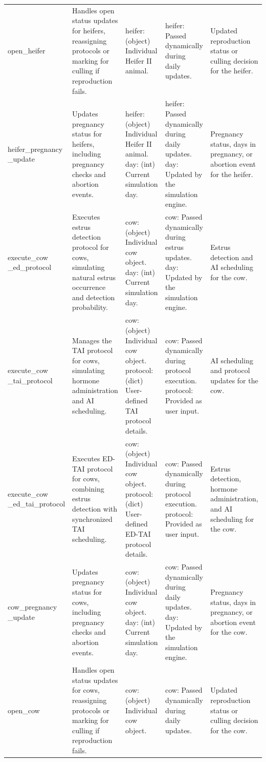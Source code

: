 \documentclass{article}
\begin{document}
\begin{refsection}
\begin{landscape}
\begin{longtable}{@{} L{3cm}  L{7cm} L{4cm} L{4cm} L{4cm}  @{}}
open\_heifer &  Handles open status updates for heifers, reassigning protocols or marking for culling if reproduction fails. & heifer: (object) Individual Heifer II animal. & heifer: Passed dynamically during daily updates. & Updated reproduction status or culling decision for the heifer. \\
heifer\_pregnancy \_update &  Updates pregnancy status for heifers, including pregnancy checks and abortion events. & heifer: (object) Individual Heifer II animal. day: (int) Current simulation day. & heifer: Passed dynamically during daily updates. day: Updated by the simulation engine. & Pregnancy status, days in pregnancy, or abortion event for the heifer. \\
execute\_cow \_ed\_protocol &  Executes estrus detection protocol for cows, simulating natural estrus occurrence and detection probability. & cow: (object) Individual cow object. day: (int) Current simulation day. & cow: Passed dynamically during estrus updates. day: Updated by the simulation engine. & Estrus detection and AI scheduling for the cow. \\
execute\_cow \_tai\_protocol &  Manages the TAI protocol for cows, simulating hormone administration and AI scheduling. & cow: (object) Individual cow object. protocol: (dict) User-defined TAI protocol details. & cow: Passed dynamically during protocol execution. protocol: Provided as user input. & AI scheduling and protocol updates for the cow. \\
execute\_cow \_ed\_tai\_protocol &  Executes ED-TAI protocol for cows, combining estrus detection with synchronized TAI scheduling. & cow: (object) Individual cow object. protocol: (dict) User-defined ED-TAI protocol details. & cow: Passed dynamically during protocol execution. protocol: Provided as user input. & Estrus detection, hormone administration, and AI scheduling for the cow. \\
cow\_pregnancy \_update &  Updates pregnancy status for cows, including pregnancy checks and abortion events. & cow: (object) Individual cow object. day: (int) Current simulation day. & cow: Passed dynamically during daily updates. day: Updated by the simulation engine. & Pregnancy status, days in pregnancy, or abortion event for the cow. \\
open\_cow &  Handles open status updates for cows, reassigning protocols or marking for culling if reproduction fails. & cow: (object) Individual cow object. & cow: Passed dynamically during daily updates. & Updated reproduction status or culling decision for the cow. \\



\end{longtable}
\end{landscape}
\end{refsection}
\end{document}
